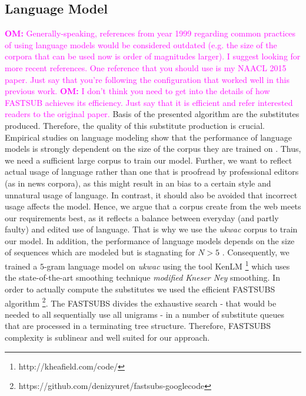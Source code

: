 \documentclass[11pt,letterpaper]{article}
\newcommand{\om}[1]{\textcolor{magenta}{\textbf{OM:} #1}}
\newcommand{\om}[1]{}
\begin{document}
\subsection{Language Model}
\om{Generally-speaking, references from year 1999 regarding common practices of using language models would be considered outdated (e.g. the size of the corpora that can be used now is order of magnitudes larger). I suggest looking for more recent references. One reference that you should use is my NAACL 2015 paper. Just say that you're following the configuration that worked well in this previous work.}
\om{I don't think you need to get into the details of how FASTSUB achieves its efficiency. Just say that it is efficient and refer interested readers to the original paper.}
Basis of the presented algorithm are the substitutes produced. 
Therefore, the quality of this substitute production is crucial. Empirical studies on language modeling show that the performance of language models is strongly dependent on the size of the corpus they are trained on \cite{chen1999empirical}. 
Thus, we need a sufficient large corpus to train our model. 
Further,  we want to reflect actual usage of language rather than one that is proofread by professional editors (as in news corpora), as this might result in an bias to a certain style and unnatural usage of language.
In contrast, it should also be avoided that incorrect usage affects the model.  
Hence, we argue that a corpus create from the web meets our requirements best, as it reflects a balance between everyday (and partly faulty) and edited use of language. 
That is why we use the \textit{ukwac} corpus \cite{baroni2009wacky} to train our model. 
In addition, the performance of language models depends on the size of sequences which are modeled but is stagnating for $N>5$ \cite{chen1999empirical}. 
Consequently, we trained a $5$-gram language model on \textit{ukwac} using the tool KenLM \cite{Heafield-estimate}\footnote{http://kheafield.com/code/} which uses the state-of-the-art smoothing technique \textit{modified Kneser Ney} smoothing. 
In order to actually compute the substitutes we used the efficient FASTSUBS algorithm \cite{yuret2012fastsubs}\footnote{https://github.com/denizyuret/fastsubs-googlecode}. 
The FASTSUBS divides the exhaustive search - that would be needed to all sequentially use all unigrams - in a number of substitute queues that are processed in a terminating tree structure.
Therefore, FASTSUBS complexity is sublinear \cite{yuret2012fastsubs} and well suited for our approach. 
\end{document}
